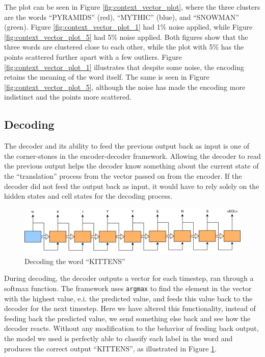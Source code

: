 The plot can be seen in Figure \ref{fig:context_vector_plot}, where the three clusters are the words ``PYRAMIDS'' (red), ``MYTHIC'' (blue), and ``SNOWMAN'' (green). Figure \ref{fig:context_vector_plot_1} had 1\% noise applied, while Figure \ref{fig:context_vector_plot_5} had 5\% noise applied. Both figures show that the three words are clustered close to each other, while the plot with 5\% has the points scattered further apart with a few outliers. Figure \ref{fig:context_vector_plot_1} illustrates that despite some noise, the encoding retains the meaning of the word itself. The same is seen in Figure \ref{fig:context_vector_plot_5}, although the noise has made the encoding more indistinct and the points more scattered.

\subsection{Decoding}
The decoder and its ability to feed the previous output back as input is one of the corner-stones in the encoder-decoder framework. Allowing the decoder to read the previous output helps the decoder know something about the current state of the ``translation'' process from the vector passed on from the encoder. If the decoder did not feed the output back as input, it would have to rely solely on the hidden states and cell states for the decoding process.

\begin{figure}[ht]
    \centering
    \includegraphics[width=1\textwidth]{fig/results/kittens_correct.png}
    \caption{Decoding the word ``KITTENS''}
    \label{fig:kittens_correct}
\end{figure}

During decoding, the decoder outputs a vector for each timestep, ran through a softmax function. The framework uses {\tt argmax} to find the element in the vector with the highest value, e.i. the predicted value, and feeds this value back to the decoder for the next timestep. Here we have altered this functionality, instead of feeding back the predicted value, we send something else back and see how the decoder reacts. Without any modification to the behavior of feeding back output, the model we used is perfectly able to classify each label in the word and produces the correct output ``KITTENS'', as illustrated in Figure \ref{fig:kittens_correct}. 


